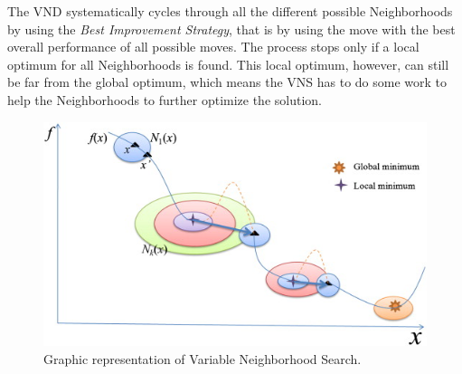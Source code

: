 \documentclass[paper=a4,fontsize=12pt]{scrartcl}
\begin{document}
{%

The VND systematically cycles through all the different possible Neighborhoods by using the \emph{Best Improvement Strategy}, that is by using the move with the best overall performance of all possible moves. The process stops only if a local optimum for all Neighborhoods is found. This local optimum, however, can still be far from the global optimum, which means the VNS has to do some work to help the Neighborhoods to further optimize the solution.


\begin{figure}
\begin{center}
\includegraphics{../img/vns.jpg} %
\end{center}
\caption{Graphic representation of Variable Neighborhood Search. \cite{Chen}} %
\end{figure}

}
\end{document}
